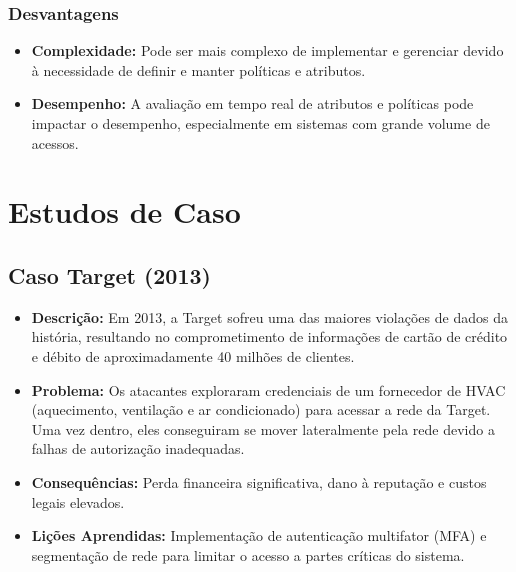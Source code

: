 \documentclass{scrartcl}
\begin{document}
\subsubsection{Desvantagens}
\label{sec:org9e6accd}
\begin{itemize}
\item \textbf{\textbf{Complexidade:}} Pode ser mais complexo de implementar e gerenciar devido à
necessidade de definir e manter políticas e atributos.
\item \textbf{\textbf{Desempenho:}} A avaliação em tempo real de atributos e políticas pode
impactar o desempenho, especialmente em sistemas com grande volume de acessos.
\end{itemize}

\section{Estudos de Caso}
\label{sec:orga681c29}

\subsection{Caso Target (2013)}
\label{sec:org05937ab}
\begin{itemize}
\item \textbf{\textbf{Descrição:}} Em 2013, a Target sofreu uma das maiores violações de dados da
história, resultando no comprometimento de informações de cartão de crédito e
débito de aproximadamente 40 milhões de clientes.
\item \textbf{\textbf{Problema:}} Os atacantes exploraram credenciais de um fornecedor de HVAC
(aquecimento, ventilação e ar condicionado) para acessar a rede da Target. Uma
vez dentro, eles conseguiram se mover lateralmente pela rede devido a falhas
de autorização inadequadas.
\item \textbf{\textbf{Consequências:}} Perda financeira significativa, dano à reputação e custos
legais elevados.
\item \textbf{\textbf{Lições Aprendidas:}} Implementação de autenticação multifator (MFA) e
segmentação de rede para limitar o acesso a partes críticas do sistema.
\end{itemize}
\end{document}
